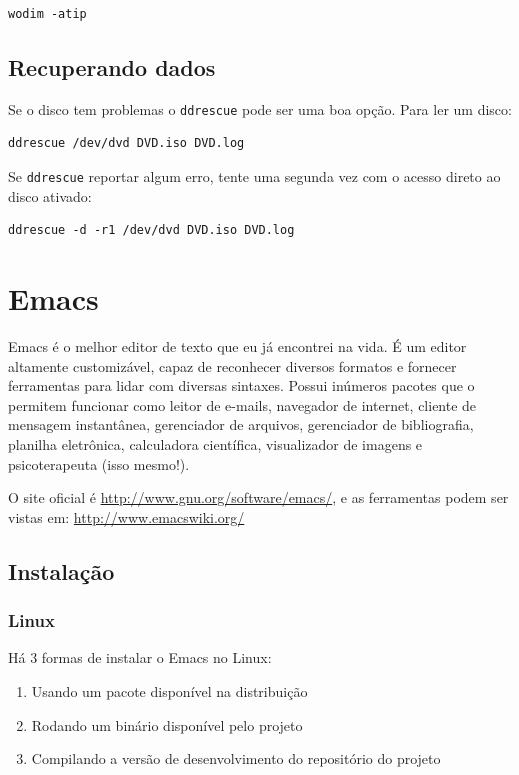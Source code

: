 \documentclass[12pt,brazil]{book}
\begin{document}
\begin{verbatim}
wodim -atip 
\end{verbatim}

\section{Recuperando dados}
\label{sec:recuperando-dados}

Se o disco tem problemas o \texttt{ddrescue} pode ser uma boa opção.
Para ler um disco:

\begin{verbatim}
ddrescue /dev/dvd DVD.iso DVD.log
\end{verbatim}

Se \texttt{ddrescue} reportar algum erro, tente uma segunda vez com o
acesso direto ao disco ativado:

\begin{verbatim}
ddrescue -d -r1 /dev/dvd DVD.iso DVD.log
\end{verbatim}

\chapter{Emacs}
\label{cha:emacs}

Emacs é o melhor editor de texto que eu já encontrei na vida. É um
editor altamente customizável, capaz de reconhecer diversos formatos e
fornecer ferramentas para lidar com diversas sintaxes. Possui inúmeros
pacotes que o permitem funcionar como leitor de e-mails, navegador de
internet, cliente de mensagem instantânea, gerenciador de arquivos,
gerenciador de bibliografia, planilha eletrônica, calculadora
científica, visualizador de imagens e psicoterapeuta (isso mesmo!).

O site oficial é \url{http://www.gnu.org/software/emacs/}, e as
ferramentas podem ser vistas em: \url{http://www.emacswiki.org/}

\section{Instalação}
\label{sec:instalacao-7}

\subsection{Linux}
\label{sec:linux}

Há 3 formas de instalar o Emacs no Linux:

\begin{enumerate}
\item Usando um pacote disponível na distribuição
\item Rodando um binário disponível pelo projeto
\item Compilando a versão de desenvolvimento do repositório do projeto
\end{enumerate}
\end{document}
